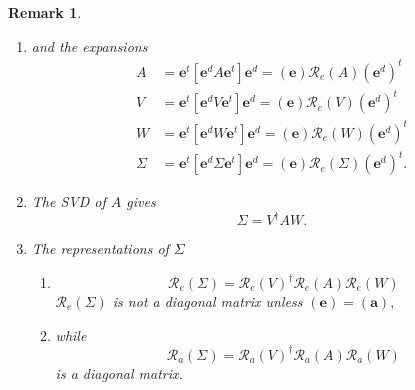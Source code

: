 \documentclass[aps,preprint]{revtex4}%
\newtheorem{remark}[theorem]{Remark}
\begin{document}
\begin{remark}


\begin{enumerate}
\item[5] and the expansions
\begin{align}
A  &  =\mathbf{e}^{t}\left[  \mathbf{e}^{d}A\mathbf{e}^{t}\right]
\mathbf{e}^{d}=\left(  \mathbf{e}\right)  \mathcal{R}_{e}\left(  A\right)
\left(  \mathbf{e}^{d}\right)  ^{t}\\
V  &  =\mathbf{e}^{t}\left[  \mathbf{e}^{d}V\mathbf{e}^{t}\right]
\mathbf{e}^{d}=\left(  \mathbf{e}\right)  \mathcal{R}_{e}\left(  V\right)
\left(  \mathbf{e}^{d}\right)  ^{t}\\
W  &  =\mathbf{e}^{t}\left[  \mathbf{e}^{d}W\mathbf{e}^{t}\right]
\mathbf{e}^{d}=\left(  \mathbf{e}\right)  \mathcal{R}_{e}\left(  W\right)
\left(  \mathbf{e}^{d}\right)  ^{t}\\
\Sigma &  =\mathbf{e}^{t}\left[  \mathbf{e}^{d}\Sigma\mathbf{e}^{t}\right]
\mathbf{e}^{d}=\left(  \mathbf{e}\right)  \mathcal{R}_{e}\left(
\Sigma\right)  \left(  \mathbf{e}^{d}\right)  ^{t}.
\end{align}


\item[6] The SVD of $A$ gives
\begin{equation}
\Sigma=V^{\dagger}AW.
\end{equation}


\item[7] The representations of $\Sigma$

\begin{enumerate}
\item
\begin{equation}
\mathcal{R}_{e}\left(  \Sigma\right)  =\mathcal{R}_{e}\left(  V\right)
^{\dagger}\mathcal{R}_{e}\left(  A\right)  \mathcal{R}_{e}\left(  W\right)
\end{equation}
$\mathcal{R}_{e}\left(  \Sigma\right)  $ is \emph{not} a diagonal matrix
unless $\left(  \mathbf{e}\right)  =\left(  \mathbf{a}\right)  ,$

\item while%
\begin{equation}
\mathcal{R}_{a}\left(  \Sigma\right)  =\mathcal{R}_{a}\left(  V\right)
^{\dagger}\mathcal{R}_{a}\left(  A\right)  \mathcal{R}_{a}\left(  W\right)
\end{equation}
\emph{is} a diagonal matrix.
\end{enumerate}
\end{enumerate}
\end{remark}
\end{document}

